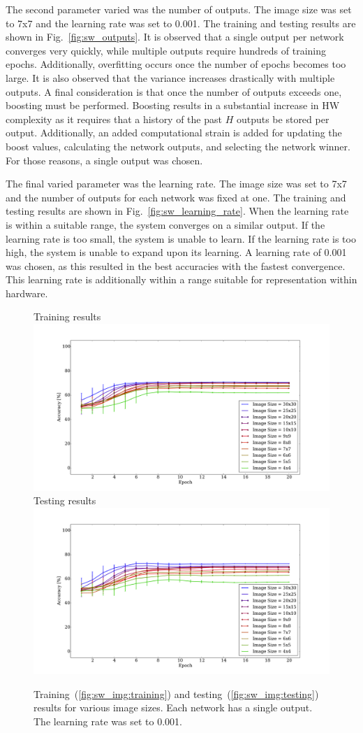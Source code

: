 \documentclass[10pt,journal]{IEEEtran}
\newcommand{\fig}[1]{Fig.~\ref{#1}}
\newcommand{\subfig}[1]{~(\ref{#1})}
\begin{document}
				The second parameter varied was the number of outputs. The image size was set to 7x7 and the learning rate was set to 0.001. The training and testing results are shown in \fig{fig:sw_outputs}. It is observed that a single output per network converges very quickly, while multiple outputs require hundreds of training epochs. Additionally, overfitting occurs once the number of epochs becomes too large. It is also observed that the variance increases drastically with multiple outputs. A final consideration is that once the number of outputs exceeds one, boosting must be performed. Boosting results in a substantial increase in HW complexity as it requires that a history of the past \(H\) outputs be stored per output. Additionally, an added computational strain is added for updating the boost values, calculating the network outputs, and selecting the network winner. For those reasons, a single output was chosen.
				
				The final varied parameter was the learning rate. The image size was set to 7x7 and the number of outputs for each network was fixed at one. The training and testing results are shown in \fig{fig:sw_learning_rate}. When the learning rate is within a suitable range, the system converges on a similar output. If the learning rate is too small, the system is unable to learn. If the learning rate is too high, the system is unable to expand upon its learning. A learning rate of 0.001 was chosen, as this resulted in the best accuracies with the fastest convergence. This learning rate is additionally within a range suitable for representation within hardware.
				
				\begin{figure}[t!]
					\captionsetup[subfigure]{position=b}
					\centering
					\hfill
					\subcaptionbox
					{
						Training results
						\label{fig:sw_img:training}
					}
					{\includegraphics[width=0.49\linewidth]{sw_img_training}}
					\hfill
					\subcaptionbox
					{
						Testing results
						\label{fig:sw_img:testing}
					}
					{\includegraphics[width=0.49\linewidth]{sw_img_testing}}
					\hfill
					\caption{Training\subfig{fig:sw_img:training} and testing\subfig{fig:sw_img:testing} results for various image sizes. Each network has a single output. The learning rate was set to 0.001.}
					\label{fig:sw_img}
				\end{figure}
				
\end{document}
